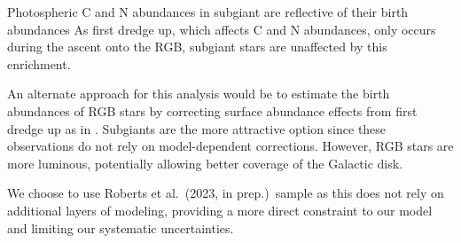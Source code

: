 \documentclass[fleqn,usenatbib]{mnras}
\newcommand{\citetjack}{Roberts et al.~(2023, in prep.)}
\begin{document}
Photospheric C and N abundances in subgiant are reflective of their birth abundances \citep{gilroy89, korn+07, lind+08, souto+18, souto19} As first dredge up, which affects C and N abundances, only occurs during the ascent onto the RGB, subgiant stars are unaffected by this enrichment. 

An alternate approach for this analysis would be to estimate the birth abundances of RGB stars by correcting surface abundance effects from first dredge up as in \cite{vincenzo+21}. Subgiants are the more attractive option since these observations do not rely on model-dependent corrections. However, RGB stars are more luminous, potentially allowing better coverage of the Galactic disk.


We choose to use \citetjack\ sample as this does not rely on additional layers of modeling, providing a more direct constraint to our model and limiting our systematic uncertainties.
\end{document}
